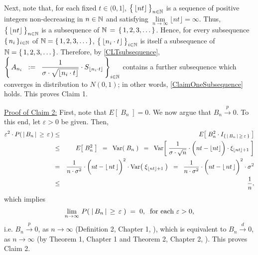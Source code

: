 \begin{enumerate}
\begin{equation}
		\end{equation}
		Next, note that, for each fixed
		$t \in (0,1]$, $\left\{\,\lfloor \overset{{\color{white}~}}{nt} \rfloor\,\right\}_{n\in\N}$
		is a sequence of positive integers non-decreasing in $n \in \mathbb{N}$ and
		satisfying $\underset{n\rightarrow\infty}{\lim}\lfloor nt \rfloor = \infty$.
		Thus, $\left\{\,\lfloor \overset{{\color{white}~}}{nt} \rfloor\,\right\}_{n\in\N}$ is a
		subsequence of $\mathbb{N} \,=\, \left\{\,1,2,3,\ldots\,\right\}$.
		Hence, for every subsequence $\{\,n_{i}\,\}_{i\in\mathbb{N}}$ of $\mathbb{N} = \{\,1,2,3,\ldots\,\}$,
		$\left\{\,\lfloor \overset{{\color{white}~}}{n_{i}\cdot t} \rfloor\,\right\}_{i\in\N}$
		is itself a subsequence of $\mathbb{N} = \{\,1,2,3,\ldots\,\}$.
		Therefore, by \eqref{CLTsubsequence},
		$
		\left\{\,
		A_{n_{i}}
		\;\; := \;\;
		\dfrac{1}{\sigma\cdot\sqrt{\lfloor n_{i}\cdot t \rfloor}}
		\cdot
		S_{\lfloor n_{i}\cdot t \rfloor}
		\,\right\}_{i \in \mathbb{N}}
		$
		contains a further subsequence which converges in distribution to $N(0,1)$;
		in other words, \eqref{ClaimOneSubsequence} holds.
		This proves Claim 1.
		
		\vskip 0.5cm
		\noindent
		\underline{Proof of Claim 2:}\quad
		First, note that $E\!\left[\;B_{n}\;\right] = 0$.
		We now argue that $B_{n} \overset{p}{\longrightarrow} 0$.
		To this end, let $\varepsilon > 0$ be given.
		Then,
		\begin{eqnarray*}
		\varepsilon^{2} \cdot P\!\left(\,\vert\,B_{n}\,\vert\,\geq\,\varepsilon\,\right)
		&\leq& E\!\left[\;B^{2}_{n} \cdot I_{\{\,\vert\,B_{n}\,\vert\,\geq\,\varepsilon\,\}}\;\right]
		\\
		&\leq& E\!\left[\;B_{n}^{2}\;\right]
		\;\;=\;\; \Var\!\left(\;B_{n}\;\right)
		\;\;=\;\;
			\Var\!\left[\;
				\dfrac{1}{\sigma\cdot\sqrt{n}}
				\cdot
				\left(\overset{{\color{white}1}}{nt} - \lfloor nt \rfloor\right)
				\cdot
				\xi_{\lfloor nt \rfloor + 1}
			\;\right]
		\\
		&=&
			\dfrac{1}{n\cdot\sigma^{2}}
			\cdot
			\left(\overset{{\color{white}1}}{nt} - \lfloor\,nt\,\rfloor\right)^{2}
			\cdot
			\Var\!\left(\;\xi_{\lfloor nt \rfloor + 1}\;\right)
		\;\;=\;\;
			\dfrac{1}{n\cdot\sigma^{2}}
			\cdot
			\left(\overset{{\color{white}1}}{nt} - \lfloor\,nt\,\rfloor\right)^{2}
			\cdot
			\sigma^{2}
		\\
		&\leq& \dfrac{1}{n},
		\end{eqnarray*}
		which implies
		\begin{equation*}
		\lim_{n\rightarrow\infty}\,P\!\left(\;\vert\,B_{n}\,\vert\,\geq\,\varepsilon\;\right) \; = \; 0,
		\;\;
		\textnormal{for each $\varepsilon > 0$},
		\end{equation*}
		i.e. $B_{n}\overset{p}{\longrightarrow}0$, as $n\longrightarrow\infty$
		(Definition 2, Chapter 1, \cite{Ferguson1996}),
		which is equivalent to $B_{n}\overset{d}{\longrightarrow}0$, as $n\longrightarrow\infty$
		(by Theorem 1, Chapter 1 and Theorem 2, Chapter 2, \cite{Ferguson1996}).
		This proves Claim 2.
		

\end{enumerate}
